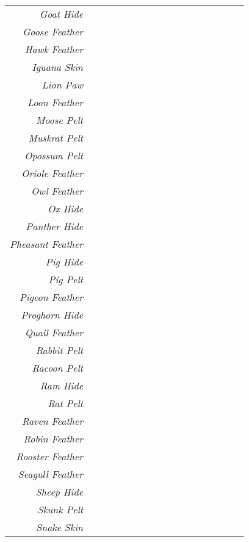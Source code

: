 \documentclass{article}
\begin{document}
\begin{footnotesize}
\begin{tabular}{|r|c|c|c|c|c|c|c|c|c|c|c|c|c|c|c|c|}
	\cline{0-7}
	\textit{Goat Hide} & & & & & & & \\
	\cline{0-7}
	\textit{Goose Feather} & & \\
	\cline{0-3}
	\textit{Hawk Feather} & & & \\
	\cline{0-3}
	\textit{Iguana Skin} & & & \\
	\cline{0-3}
	\textit{Lion Paw} & \\
	\cline{0-2}
	\textit{Loon Feather} & & \\
	\cline{0-4}
	\textit{Moose Pelt} & & & & \\
	\cline{0-6}
	\textit{Muskrat Pelt} & & & & & & \\
	\cline{0-6}
	\textit{Opossum Pelt} & & & & \\
	\cline{0-5}
	\textit{Oriole Feather} & & & & & \\
	\cline{0-5}
	\textit{Owl Feather} & \\
	\cline{0-3}
	\textit{Ox Hide} & & & \\
	\cline{0-3}
	\textit{Panther Hide} & & & \\
	\cline{0-3}
	\textit{Pheasant Feather} & & \\
	\cline{0-2}
	\textit{Pig Hide} & & \\
	\cline{0-3}
	\textit{Pig Pelt} & & & \\
	\cline{0-3}
	\textit{Pigeon Feather} & & \\
	\cline{0-4}
	\textit{Proghorn Hide} & & & & \\
	\cline{0-4}
	\textit{Quail Feather} & & \\
	\cline{0-7}
	\textit{Rabbit Pelt} & & & & & & & \\
	\cline{0-7}
	\textit{Racoon Pelt} & \\
	\cline{0-5}
	\textit{Ram Hide} & & & & & \\
	\cline{0-16}
	\textit{Rat Pelt} & & & & & & & & & & & & & & & & \\
	\cline{0-16}
	\textit{Raven Feather} & & & & & & & & & & & & & \\
	\cline{0-13}
	\textit{Robin Feather} & & & & & & & \\
	\cline{0-7}
	\textit{Rooster Feather} & & & & \\
	\cline{0-4}
	\textit{Seagull Feather} & \\
	\cline{0-8}
	\textit{Sheep Hide} & & & & & & & & \\
	\cline{0-8}
	\textit{Skunk Pelt} & & & \\
	\cline{0-15}
	\textit{Snake Skin} & & & & & & & & & & & & & & & \\

\end{tabular}
\end{footnotesize}
\end{document}
